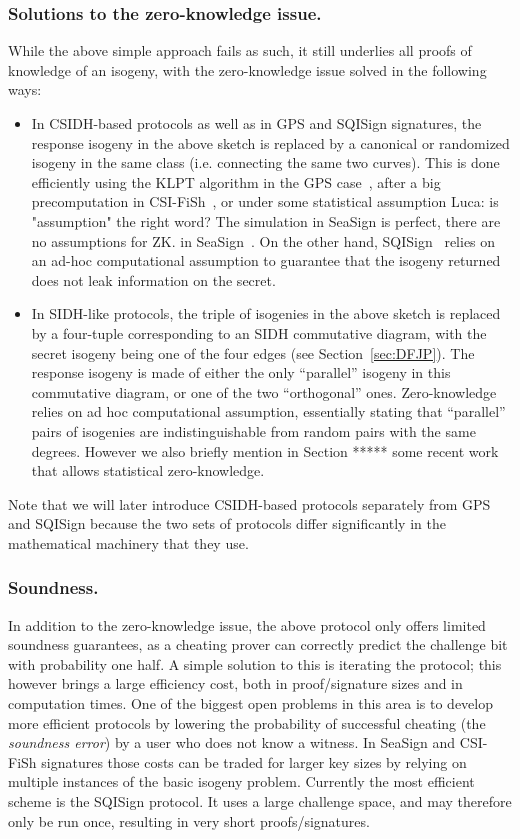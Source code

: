 \documentclass{llncs}
\newcommand{\comment}[1]{{\color{gray}#1}}
\newcommand{\LDF}[1]{\comment{Luca: #1}}
\begin{document}
\subsubsection{Solutions to the zero-knowledge issue.}
While the above simple approach fails  as such, it still underlies all proofs of knowledge of an isogeny, with the zero-knowledge issue solved in the following ways:
\begin{itemize}
    \item In CSIDH-based protocols as well as in GPS and SQISign signatures, the response isogeny in the above sketch is replaced by a canonical or randomized isogeny in the same class (i.e. connecting the same two curves). This is done efficiently using the KLPT algorithm in the GPS case~\cite{GPS20}, after a big precomputation in CSI-FiSh~\cite{CSI-FiSh}, or under some statistical assumption \LDF{is "assumption" the right word? The simulation in SeaSign is perfect, there are no assumptions for ZK.} in SeaSign~\cite{SeaSign}. On the other hand, SQISign~\cite{DFKLPW20} relies on an ad-hoc computational assumption to guarantee that the isogeny returned does not leak information on the secret.
%
    \item In SIDH-like protocols, the triple of isogenies in the above sketch is replaced by a four-tuple corresponding to an SIDH commutative diagram, with the secret isogeny being one of the four edges (see Section~\ref{sec:DFJP}).  The response isogeny is made of either the only ``parallel'' isogeny in this commutative diagram, or one of the two ``orthogonal'' ones. %
    Zero-knowledge relies on  ad hoc computational assumption, essentially stating that ``parallel'' pairs of isogenies are indistinguishable from random pairs with the same degrees.
    However we also briefly mention in Section ***** some recent work that allows statistical zero-knowledge.
\end{itemize}

    Note that we will later introduce CSIDH-based protocols separately from GPS and SQISign because the two sets of protocols differ significantly in the mathematical machinery that they use.

\subsubsection{Soundness.} In addition to the zero-knowledge issue, the above protocol  only offers limited soundness guarantees, as a cheating prover can correctly predict the challenge bit with probability one half. 
%
A simple solution to this is iterating the protocol; this however brings a large efficiency cost, both in proof/signature sizes and in computation times.
One of the biggest open problems in this area is to develop more efficient protocols by lowering the probability of successful cheating (the \emph{soundness error}) by a user who does not know a witness.
%
In SeaSign and CSI-FiSh signatures those costs can be traded for larger key sizes by relying on multiple instances of the basic isogeny problem.
%
Currently the most efficient scheme is the SQISign protocol. It uses a large challenge space, and may therefore only be run once, resulting in very short proofs/signatures.
\end{document}
